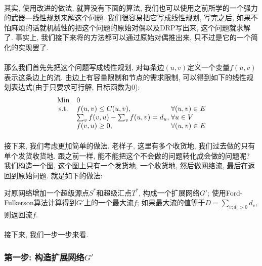 \documentclass[a4paper]{article}
\begin{document}
        \paragraph{}其实, 使用改进的做法, 就算没有下面的算法, 我们也可以使用之前所学的一个强力的武器—线性规划来解这个问题. 我们很容易把它写成线性规划, 写完之后, 如果不怕麻烦的话就机械性的把这个问题的原始对偶以及DRP写出来, 这个问题就求解了. 事实上, 我们接下来将的方法都可以通过原始对偶推出来, 只不过是它的一个简化的实现罢了.   
        \paragraph{}那么我们首先先把这个问题写成线性规划, 对每条边$(u,v)$定义一个变量$f(u,v)$表示这条边上的流. 由边上有容量限制和节点的需求限制, 可以得到如下的线性规划表达式(由于只要求可行解, 目标函数为0):
        \begin{equation*}
\begin{array}{cl@{}ll}
\text{Min}  & 0 &\\
\text{s.t.} & f(u,v) \leq C(u,v),\;  & \forall (u,v) \in E  \\
            & \sum_{v}{f(v,u)} - \sum_{v}{f(u,v)} = d_u, \;  & \forall u \in V \\
            & f(v,u) \geq 0, \; & \forall (u,v) \in E \\
            
\end{array}
        \end{equation*}
        
        \paragraph{}接下来, 我们考虑更加简单的做法. 老样子, 这里有多个收货地, 我们过去做的只有单个发货收货地. 跟之前一样, 能不能把这个不会做的问题转化成会做的问题呢? 我们构造一个图, 这个图上只有一个发货地, 一个收货地, 然后做网络流, 最后在返回到原始问题. 就是如下的做法:
        \begin{algorithmic}[1]
            \STATE 对原网络增加一个超级源点$S^*$和超级汇点$T^*$, 构成一个扩展网络$G'$;
            \STATE 使用Ford-Fulkerson算法计算得到$G'$上的一个最大流$f$;
            \STATE 如果最大流的值等于$D=\sum_{v: d_v > 0} d_v$, 则返回流$f$.
        \end{algorithmic}
        \paragraph{}接下来, 我们一步一步来看.
        \subsubsection*{第一步: 构造扩展网络$G'$}
\end{document}
